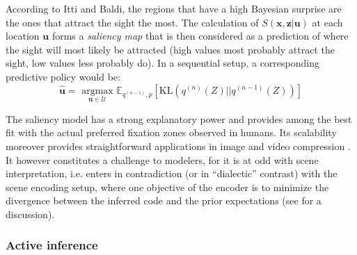 \documentclass[12pt,twoside,openright]{article}
\begin{document}
According to Itti and Baldi, the regions that have a high Bayesian surprise are the ones that attract the sight the most. The calculation of $S(\boldsymbol{x}, \boldsymbol{z}| \boldsymbol{u})$ at each location $\boldsymbol{u}$ forms a \emph{saliency map} that is then considered as a prediction of where the sight will most likely be attracted (high values most probably attract the sight, low values less probably do). 
In a sequential setup, a corresponding predictive policy would be:
$$ \hat{\boldsymbol{u}} = \underset{\boldsymbol{u} \in \mathcal{U}}{\text{ argmax }} \mathbb{E}_{q^{(n-1)}, p}\left[\text{KL}(q^{(n)}(Z)||q^{(n-1)}(Z))\right]$$


The saliency model has a strong explanatory power and provides among the best fit with the actual preferred fixation zones observed in humans.
Its scalability moreover provides straightforward applications in image and video compression  \cite{wang2003foveation,guo2010novel}.
It  however constitutes a challenge to modelers, for it is at odd with scene interpretation,  
i.e. enters in contradiction (or in ``dialectic'' contrast) with the scene encoding setup, where one objective of the encoder is to minimize the divergence between the inferred code and the prior expectations (see \cite{friston2015active} for a discussion).

\subsubsection{Active inference}
\end{document}
